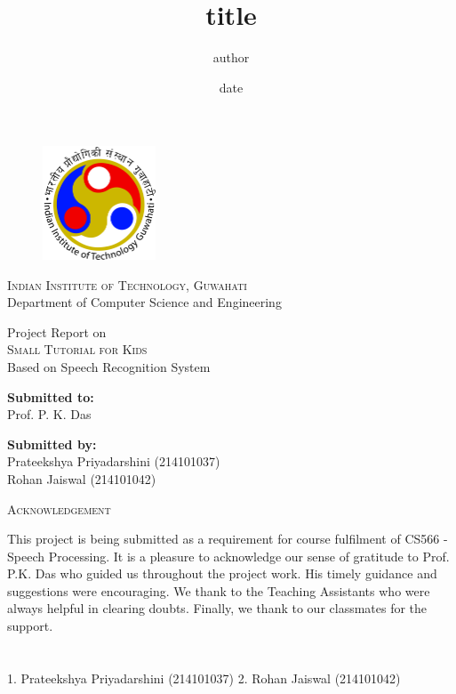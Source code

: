\documentclass{article}
\begin{document}
\title{title}
\author{author}
\date{date}

\begin{titlepage}
\begin{figure}[t]
    \centering\includegraphics[width=0.3\textwidth]{IITG_logo}
\end{figure}
\begin{center}
    \textsc{ \LARGE{Indian Institute of Technology, Guwahati \\}}
	\textnormal{ \LARGE{Department of Computer Science and Engineering\\ }}
	 
    \textup{Project Report on}\\
	\textsc{ \LARGE{Small Tutorial for Kids\\ }}
	\textup{Based on Speech Recognition System}\\ 
	\vspace{30mm}
	\fontsize{10mm}{7mm}\selectfont
\end{center}

\vspace{25mm}

\begin{minipage}[t]{0.4\textwidth}
	\textnormal{\large{\bf Submitted to:\\}}
	{\large Prof. P. K. Das}
\end{minipage}\hfill
\begin{minipage}[t]{0.6\textwidth}\raggedleft
	\textnormal{\large{\bf Submitted by:\\}}
	{\large Prateekshya Priyadarshini (214101037)\\Rohan Jaiswal (214101042)}
\end{minipage}

\vspace{20mm}
\end{titlepage}
\begin{center}
    \textsc{ \LARGE{Acknowledgement \\}}
\end{center}
This project is being submitted as a requirement for course fulfilment of CS566 - Speech Processing. It is a pleasure to acknowledge our sense of gratitude to Prof. P.K. Das who guided us throughout the project work. His timely guidance and suggestions were encouraging. We thank to the Teaching Assistants who were always helpful in clearing doubts. Finally, we thank to our classmates for the support.\\\\\\
1. Prateekshya Priyadarshini (214101037) 2. Rohan Jaiswal (214101042)
\newpage
\tableofcontents
\newpage
\listoffigures
\newpage
\listoftables
\newpage
\end{document}
